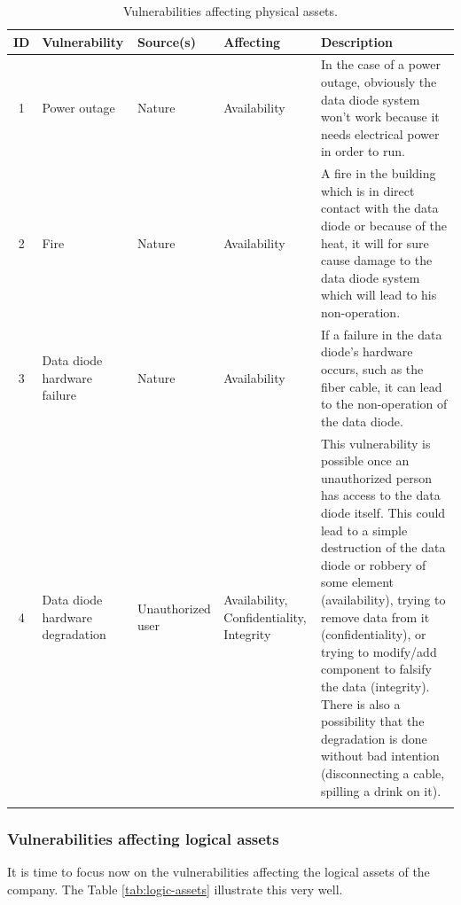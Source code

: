 \documentclass[a4paper,10pt]{article}
\begin{document}
\begin{longtable}{|c|p{2.5cm}|p{2.5cm}|p{2.5cm}|p{6.5cm}|}
\hline
\textbf{ID}&  \textbf{Vulnerability} & \textbf{Source(s)} & \textbf{Affecting} & \textbf{Description} \\
\hline
1 & Power outage & Nature & Availability & In the case of a power outage, obviously the data diode system won't work because it needs electrical power in order to run.  \\
\hline
2 & Fire & Nature & Availability & A fire in the building which is in direct contact with the data diode or because of the heat, it will for sure cause damage to the data diode system which will lead to his non-operation.\\
\hline
3 & Data diode hardware failure & Nature & Availability & If a failure in the data diode's hardware occurs, such as the fiber cable, it can lead to the non-operation of the data diode. \\
\hline
4 & Data diode hardware degradation & Unauthorized user & Availability, Confidentiality, Integrity & This vulnerability is possible once an unauthorized person has access to the data diode itself. This could lead to a simple destruction of the data diode or robbery of some element (availability), trying to remove data from it (confidentiality), or trying to modify/add component to falsify the data (integrity). There is also a possibility that the degradation is done without bad intention (disconnecting a cable, spilling a drink on it).\\
\hline
\caption{Vulnerabilities affecting physical assets.}
\label{tab:phys-assets}
\end{longtable}

\subsubsection{Vulnerabilities affecting logical assets}
It is time to focus now on the vulnerabilities affecting the logical assets of the company. The Table \ref{tab:logic-assets} illustrate this very well.
\end{document}
